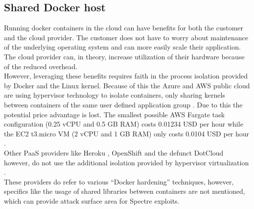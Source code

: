 \documentclass[conference,compsoc,final,a4paper]{IEEEtran}
\begin{document}
\subsection{Shared Docker host}
Running docker containers in the cloud can have benefits for both the customer and the cloud provider. The customer does not have to worry about maintenance of the underlying operating system and can more easily scale their application. The cloud provider can, in theory, increase utilization of their hardware because of the reduced overhead. \\
However, leveraging these benefits requires faith in the process isolation provided by Docker and the Linux kernel. Because of this the Azure and \ac{AWS} public cloud are using hypervisor technology to isolate containers, only sharing kernels between containers of the same user defined application group \cite{fargateIsolation, azureIsolation}. Due to this the potential price advantage is lost. The smallest possible \ac{AWS} Fargate task configuration (0.25 vCPU and 0.5 GB RAM) costs 0.01234 USD per hour \cite{fargatePricing} while the EC2 t3.micro VM (2 vCPU and 1 GB RAM) only costs 0.0104 USD per hour \cite{ec2Pricing}. \\
Other \ac{PaaS} providers like Heroku \cite{herokuIsolation}, OpenShift \cite{openshiftIsolation} and the defunct DotCloud however, do not use the additional isolation provided by hypervisor virtualization \cite{zhang2014cross}. \\
These providers do refer to various \enquote{Docker hardening} techniques, however, specifics like the usage of shared libraries between containers are not mentioned, which can provide attack surface area for Spectre exploits. \cite{retpolineTurner}
\end{document}
